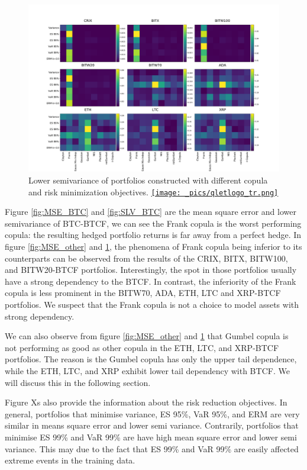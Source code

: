 \begin{figure}[ht]
    \centering
    \includegraphics[width=\textwidth]{_pics/semiLowerVariance_other.pdf}
  \caption{Lower semivariance of portfolios constructed with different copula and risk minimization objectives.
  \href{http://www.quantlet.com/}{\texttt{[image: \_pics/qletlogo\_tr.png]}} }
\label{fig:SLV_other}
\end{figure}


Figure \ref{fig:MSE_BTC} and \ref{fig:SLV_BTC} are the mean square error and lower semivariance of BTC-BTCF, we can see the Frank copula is the worst performing copula:
the resulting hedged portfolio returns is far away from a perfect hedge.
In figure \ref{fig:MSE_other} and \ref{fig:SLV_other}, the phenomena of Frank copula being inferior to its counterparts can be observed from the results of the CRIX, BITX, BITW100, and BITW20-BTCF portfolios.
Interestingly, the spot in those portfolios usually have a strong dependency to the BTCF.
In contrast, the inferiority of the Frank copula is less prominent in the BITW70, ADA, ETH, LTC and XRP-BTCF portfolios.
We suspect that the Frank copula is not a choice to model assets with strong dependency.  \medskip

We can also observe from figure \ref{fig:MSE_other} and \ref{fig:SLV_other} that Gumbel copula is not performing as good as other copula in the ETH, LTC, and XRP-BTCF portfolios.
The reason is the Gumbel copula has only the upper tail dependence, while the ETH, LTC, and XRP exhibit lower tail dependency with BTCF.
We will discuss this in the following section. \medskip

Figure Xs also provide the information about the risk reduction objectives.
In general, portfolios that minimise variance, ES 95\%, VaR 95\%, and ERM are very similar in means square error and lower semi variance.
Contrarily, portfolios that minimise ES 99\% and VaR 99\% are have high mean square error and lower semi variance.
This may due to the fact that ES 99\% and VaR 99\% are easily affected extreme events in the training data. \medskip

